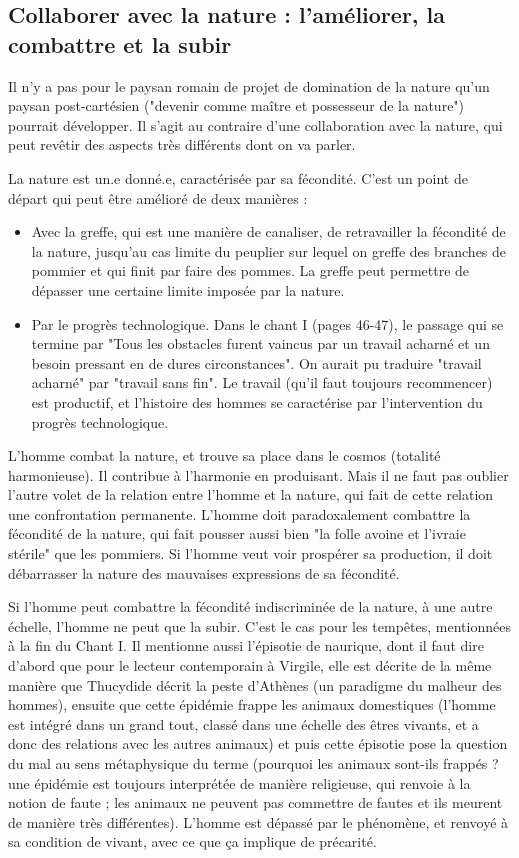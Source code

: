 \documentclass[a4paper,12pt]{book}
\begin{document}
\subsection{Collaborer avec la nature : l'améliorer, la combattre et la subir}
Il n'y a pas pour le paysan romain de projet de domination de la nature qu'un paysan post-cartésien ("devenir comme maître et possesseur de la nature") pourrait développer. Il s'agit au contraire d'une collaboration avec la nature, qui peut revêtir des aspects très différents dont on va parler.
\par La nature est un.e donné.e, caractérisée par sa fécondité. C'est un point de départ qui peut être amélioré de deux manières :\begin{itemize}
\item Avec la greffe, qui est une manière de canaliser, de retravailler la fécondité de la nature, jusqu'au cas limite du peuplier sur lequel on greffe des branches de pommier et qui finit par faire des pommes. La greffe peut permettre de dépasser une certaine limite imposée par la nature.
\item Par le progrès technologique. Dans le chant I (pages 46-47), le passage qui se termine par "Tous les obstacles furent vaincus par un travail acharné et un besoin pressant en de dures circonstances". On aurait pu traduire "travail acharné" par "travail sans fin". Le travail (qu'il faut toujours recommencer) est productif, et l'histoire des hommes se caractérise par l'intervention du progrès technologique. 
\end{itemize}
L'homme combat la nature, et trouve sa place dans le cosmos (totalité harmonieuse). Il contribue à l'harmonie en produisant. Mais il ne faut pas oublier l'autre volet de la relation entre l'homme et la nature, qui fait de cette relation une confrontation permanente. L'homme doit paradoxalement combattre la fécondité de la nature, qui fait pousser aussi bien "la folle avoine et l'ivraie stérile" que les pommiers. Si l'homme veut voir prospérer sa production, il doit débarrasser la nature des mauvaises expressions de sa fécondité.
\par Si l'homme peut combattre la fécondité indiscriminée de la nature, à une autre échelle, l'homme ne peut que la subir. C'est le cas pour les tempêtes, mentionnées à la fin du Chant I. Il mentionne aussi l'épisotie de naurique, dont il faut dire d'abord que pour le lecteur contemporain à Virgile, elle est décrite de la même manière que Thucydide décrit la peste d'Athènes (un paradigme du malheur des hommes), ensuite que cette épidémie frappe les animaux domestiques (l'homme est intégré dans un grand tout, classé dans une échelle des êtres vivants, et a donc des relations avec les autres animaux) et puis cette épisotie pose la question du mal au sens métaphysique du terme (pourquoi les animaux sont-ils frappés ? une épidémie est toujours interprétée de manière religieuse, qui renvoie à la notion de faute ; les animaux ne peuvent pas commettre de fautes et ils meurent de manière très différentes). L'homme est dépassé par le phénomène, et renvoyé à sa condition de vivant, avec ce que ça implique de précarité.
\end{document}

